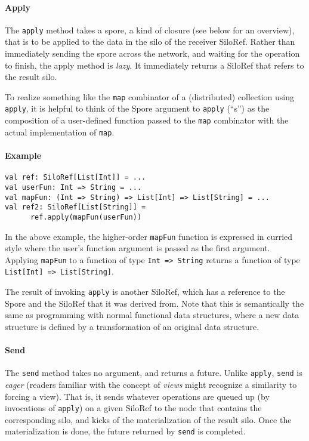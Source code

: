 \documentclass{easychair}
\begin{document}
\paragraph{Apply}

The \verb|apply| method takes a spore, a kind of closure (see below for an overview), that is to be applied to
the data in the silo of the receiver SiloRef. Rather than immediately sending
the spore across the network, and waiting for the operation to finish, the
apply method is \emph{lazy}. It immediately returns a SiloRef that refers to the
result silo.

To realize something like the \verb|map| combinator of a (distributed) collection using \verb|apply|,
it is helpful to think of the Spore argument to \verb|apply| (``s'') as the composition of a
user-defined function passed to the \verb|map| combinator with the actual implementation of \verb|map|.

\paragraph{Example}

\begin{verbatim}
val ref: SiloRef[List[Int]] = ...
val userFun: Int => String = ...
val mapFun: (Int => String) => List[Int] => List[String] = ...
val ref2: SiloRef[List[String]] =
      ref.apply(mapFun(userFun))
\end{verbatim}

In the above example, the higher-order \verb|mapFun| function is expressed in curried
style where the user's function argument is passed as the first argument.
Applying \verb|mapFun| to a function of type \verb|Int => String| returns a function of type
\verb|List[Int] => List[String]|.

The result of invoking \verb|apply| is another SiloRef, which has a reference to the
Spore and the SiloRef that it was derived from. Note that this is semantically
the same as programming with normal functional data structures, where a new
data structure is defined by a transformation of an original data structure.

\paragraph{Send}

The \verb|send| method takes no argument, and returns a future. Unlike
\verb|apply|, \verb|send| is \emph{eager} (readers familiar with the concept
of \emph{views} might recognize a similarity to forcing a view). That is, it
sends whatever operations are queued up (by invocations of \verb|apply|) on a
given SiloRef to the node that contains the corresponding silo, and kicks of
the materialization of the result silo. Once the materialization is done, the
future returned by \verb|send| is completed.
\end{document}
